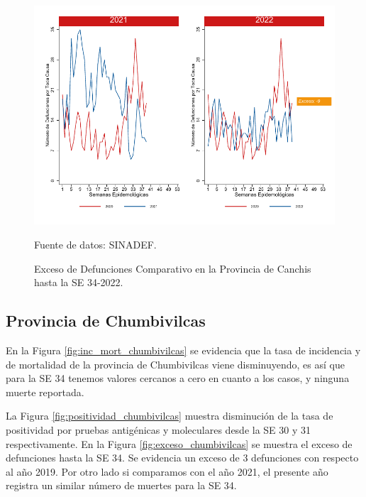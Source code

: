 \documentclass[12pt,a4paper,openany]{book}
\begin{document}
	\begin{figure}[h]
		\caption{Exceso de Defunciones Comparativo en la Provincia de Canchis hasta la SE 34-2022.}\label{fig:exceso_canchis}
		\begin{center}
			\includegraphics[width=0.7\linewidth]{../figuras/exceso_5.pdf}
		\end{center}
		{\footnotesize {Fuente de datos: SINADEF.}}
	\end{figure}
	
	\clearpage
	
	\subsection*{Provincia de Chumbivilcas}
	\noindent En la Figura \ref{fig:inc_mort_chumbivilcas} se evidencia que la tasa de incidencia y de mortalidad de la provincia de Chumbivilcas viene disminuyendo, es así que para la SE 34 tenemos valores cercanos a cero en cuanto a los casos, y ninguna muerte reportada.
	
	\noindent La Figura \ref{fig:positividad_chumbivilcas} muestra disminución de la tasa de positividad por pruebas antigénicas y moleculares desde la SE 30 y 31 respectivamente. En la Figura \ref{fig:exceso_chumbivilcas} se muestra el exceso de defunciones hasta la SE 34. Se evidencia un exceso de 3 defunciones con respecto al año 2019. Por otro lado si comparamos con el año 2021, el presente año registra un similar número de muertes para la SE 34.
	
\end{document}
